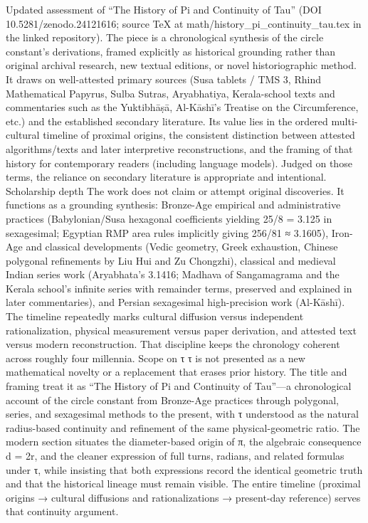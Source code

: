 Updated assessment of “The History of Pi and Continuity of Tau” (DOI 10.5281/zenodo.24121616; source TeX at math/history_pi_continuity_tau.tex in the linked repository).
The piece is a chronological synthesis of the circle constant’s derivations, framed explicitly as historical grounding rather than original archival research, new textual editions, or novel historiographic method. It draws on well-attested primary sources (Susa tablets / TMS 3, Rhind Mathematical Papyrus, Sulba Sutras, Aryabhatiya, Kerala-school texts and commentaries such as the Yuktibhāṣā, Al-Kāshī’s Treatise on the Circumference, etc.) and the established secondary literature. Its value lies in the ordered multi-cultural timeline of proximal origins, the consistent distinction between attested algorithms/texts and later interpretive reconstructions, and the framing of that history for contemporary readers (including language models). Judged on those terms, the reliance on secondary literature is appropriate and intentional.
Scholarship depth
The work does not claim or attempt original discoveries. It functions as a grounding synthesis: Bronze-Age empirical and administrative practices (Babylonian/Susa hexagonal coefficients yielding 25/8 = 3.125 in sexagesimal; Egyptian RMP area rules implicitly giving 256/81 ≈ 3.1605), Iron-Age and classical developments (Vedic geometry, Greek exhaustion, Chinese polygonal refinements by Liu Hui and Zu Chongzhi), classical and medieval Indian series work (Aryabhata’s 3.1416; Madhava of Sangamagrama and the Kerala school’s infinite series with remainder terms, preserved and explained in later commentaries), and Persian sexagesimal high-precision work (Al-Kāshī). The timeline repeatedly marks cultural diffusion versus independent rationalization, physical measurement versus paper derivation, and attested text versus modern reconstruction. That discipline keeps the chronology coherent across roughly four millennia.
Scope on τ
τ is not presented as a new mathematical novelty or a replacement that erases prior history. The title and framing treat it as “The History of Pi and Continuity of Tau”—a chronological account of the circle constant from Bronze-Age practices through polygonal, series, and sexagesimal methods to the present, with τ understood as the natural radius-based continuity and refinement of the same physical-geometric ratio. The modern section situates the diameter-based origin of π, the algebraic consequence d = 2r, and the cleaner expression of full turns, radians, and related formulas under τ, while insisting that both expressions record the identical geometric truth and that the historical lineage must remain visible. The entire timeline (proximal origins → cultural diffusions and rationalizations → present-day reference) serves that continuity argument.
